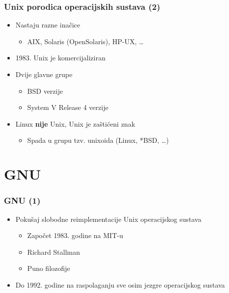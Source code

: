 \documentclass{beamer}
\begin{document}
\begin{frame}[t]
\frametitle{Unix porodica operacijskih sustava (2)}
\begin{itemize}
  \item Nastaju razne inačice
  \begin{itemize}
    \item AIX, Solaris (OpenSolaris), HP-UX, \ldots
  \end{itemize}
  \item 1983. Unix je komercijaliziran
  \item Dvije glavne grupe
  \begin{itemize}
    \item BSD verzije
    \item System V Release 4 verzije
  \end{itemize}
  \item Linux \textbf{nije} Unix, Unix je zaštićeni znak
  \begin{itemize}
    \item Spada u grupu tzv. unixoida (Linux, *BSD, \ldots)
  \end{itemize}
\end{itemize}
\end{frame}

\section{GNU}
\begin{frame}[t]
\frametitle{GNU (1)}
\begin{itemize}
  \item Pokušaj slobodne reimplementacije Unix operacijskog sustava
  \begin{itemize}
    \item Započet 1983. godine na MIT-u
    \item Richard Stallman
    \item Puno filozofije
  \end{itemize}
  \item Do 1992. godine na raspolaganju sve osim jezgre operacijskog 
        sustava
\end{itemize}
\end{frame}
\end{document}
